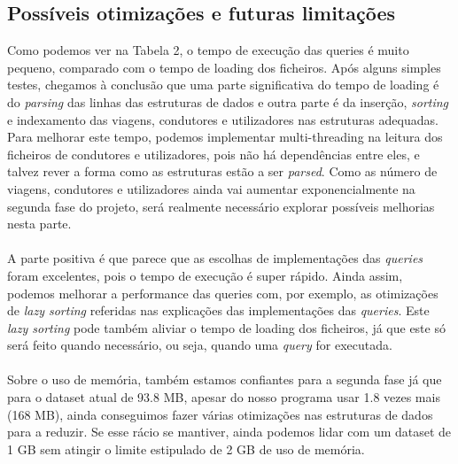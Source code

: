 \documentclass{article}
\begin{document}
        \subsection{Possíveis otimizações e futuras limitações}
        Como podemos ver na Tabela 2, o tempo de execução das queries é muito
        pequeno, comparado com o tempo de loading dos ficheiros.
        Após alguns simples testes, chegamos à conclusão que uma parte 
        significativa do tempo de loading é do \emph{parsing} das linhas
        das estruturas de dados e outra parte é da inserção, \emph{sorting} 
        e indexamento das viagens, condutores e utilizadores nas estruturas
        adequadas. Para melhorar este tempo, podemos implementar multi-threading
        na leitura dos ficheiros de condutores e utilizadores, pois não há
        dependências entre eles, e talvez rever a forma como as estruturas
        estão a ser \emph{parsed}. Como as número de viagens, condutores e
        utilizadores ainda vai aumentar exponencialmente na segunda fase
        do projeto, será realmente necessário explorar possíveis melhorias
        nesta parte.
        \\
        \\A parte positiva é que parece que as escolhas de implementações
        das \emph{queries} foram excelentes, pois o tempo de execução é
        super rápido. Ainda assim, podemos melhorar a performance das queries
        com, por exemplo, as otimizações de \emph{lazy sorting} referidas nas explicações
        das implementações das \emph{queries}. Este \emph{lazy sorting} pode
        também aliviar o tempo de loading dos ficheiros, já que este só será
        feito quando necessário, ou seja, quando uma \emph{query} for executada. 
        \\
        \\Sobre o uso de memória, também estamos confiantes para a segunda fase
        já que para o dataset atual de 93.8 MB, apesar do nosso programa usar
        1.8 vezes mais (168 MB), ainda conseguimos fazer várias otimizações nas 
        estruturas de dados para a reduzir. Se esse rácio se mantiver, ainda podemos
        lidar com um dataset de 1 GB sem atingir o limite estipulado de 2 GB de 
        uso de memória.
        
\end{document}

